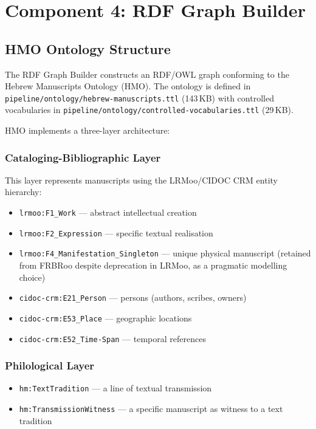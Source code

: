 \documentclass[12pt]{article}
\newcommand{\filepath}[1]{\texttt{\small #1}}
\newcommand{\code}[1]{\texttt{#1}}
\begin{document}
\section{Component 4: RDF Graph Builder}
\label{sec:rdf-builder}

\subsection{HMO Ontology Structure}

The RDF Graph Builder constructs an RDF/OWL graph conforming to the Hebrew Manuscripts Ontology (HMO). The ontology is defined in \filepath{pipeline/ontology/hebrew-manuscripts.ttl} (143\,KB) with controlled vocabularies in \filepath{pipeline/ontology/controlled-vocabularies.ttl} (29\,KB).

HMO implements a three-layer architecture:

\subsubsection{Cataloging-Bibliographic Layer}

This layer represents manuscripts using the LRMoo/CIDOC CRM entity hierarchy:

\begin{itemize}
\item \code{lrmoo:F1\_Work} --- abstract intellectual creation
\item \code{lrmoo:F2\_Expression} --- specific textual realisation
\item \code{lrmoo:F4\_Manifestation\_Singleton} --- unique physical manuscript (retained from FRBRoo despite deprecation in LRMoo, as a pragmatic modelling choice)
\item \code{cidoc-crm:E21\_Person} --- persons (authors, scribes, owners)
\item \code{cidoc-crm:E53\_Place} --- geographic locations
\item \code{cidoc-crm:E52\_Time-Span} --- temporal references
\end{itemize}

\subsubsection{Philological Layer}

\begin{itemize}
\item \code{hm:TextTradition} --- a line of textual transmission
\item \code{hm:TransmissionWitness} --- a specific manuscript as witness to a text tradition
\end{itemize}
\end{document}
